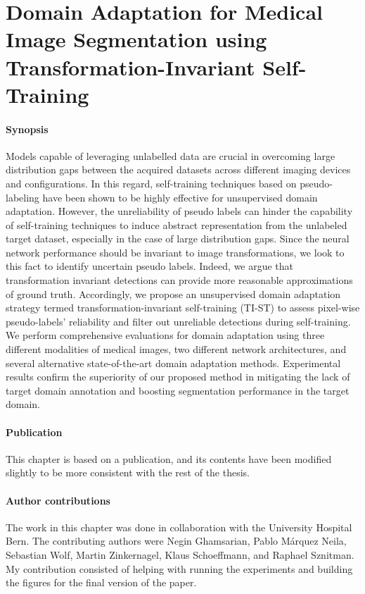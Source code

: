 \graphicspath{{ch5_tist/}{figures/}}

\chapter{Domain Adaptation for Medical Image Segmentation using Transformation-Invariant Self-Training}
\label{chapter:tist}


\subsubsection{Synopsis}Models capable of leveraging unlabelled data are crucial in overcoming large distribution gaps between the acquired datasets across different imaging devices and configurations. In this regard, self-training techniques based on pseudo-labeling have been shown to be highly effective for unsupervised domain adaptation. However, the unreliability of pseudo labels can hinder the capability of self-training techniques to induce abstract representation from the unlabeled target dataset, especially in the case of large distribution gaps. 
Since the neural network performance should be invariant to image transformations, we look to this fact to identify uncertain pseudo labels. Indeed, we argue that transformation invariant detections can provide more reasonable approximations of ground truth. Accordingly, we propose an unsupervised domain adaptation strategy termed transformation-invariant self-training (TI-ST) to assess pixel-wise pseudo-labels' reliability and filter out unreliable detections during self-training. We perform comprehensive evaluations for domain adaptation using three different modalities of medical images, two different network architectures, and several alternative state-of-the-art domain adaptation methods. Experimental results confirm the superiority of our proposed method in mitigating the lack of target domain annotation and boosting segmentation performance in the target domain.

\subsubsection{Publication}This chapter is based on a publication, and its contents have been modified slightly to be more consistent with the rest of the thesis. 

\subsubsection{Author contributions}The work in this chapter was done in collaboration with the University Hospital Bern. The contributing authors were Negin Ghamsarian, Pablo Márquez Neila, Sebastian Wolf, Martin Zinkernagel, Klaus Schoeffmann, and Raphael Sznitman. My contribution consisted of helping with running the experiments and building the figures for the final version of the paper.






